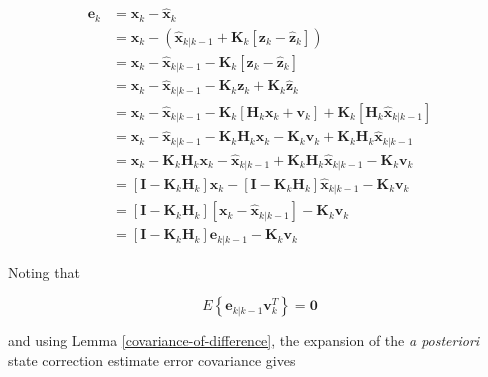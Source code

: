 \documentclass[12pt]{article}
\begin{document}
\begin{equation*}
    \begin{aligned}
        \mathbf{e}_{k} &= \mathbf{x}_{k} - \hat{\mathbf{x}}_{k} \\
        &= \mathbf{x}_{k} - \left( \hat{\mathbf{x}}_{k|k-1} + \mathbf{K}_k \left[ \mathbf{z}_k - \hat{\mathbf{z}}_k \right] \right) \\
        &= \mathbf{x}_{k} - \hat{\mathbf{x}}_{k|k-1} - \mathbf{K}_k \left[ \mathbf{z}_k - \hat{\mathbf{z}}_k \right] \\
        &= \mathbf{x}_{k} - \hat{\mathbf{x}}_{k|k-1} - \mathbf{K}_k \mathbf{z}_k + \mathbf{K}_k \hat{\mathbf{z}}_k \\
        &= \mathbf{x}_{k} - \hat{\mathbf{x}}_{k|k-1} - \mathbf{K}_k \left[ \mathbf{H}_k \mathbf{x}_k + \mathbf{v}_k \right]
        + \mathbf{K}_k \left[ \mathbf{H}_k \hat{\mathbf{x}}_{k|k-1} \right] \\
        &= \mathbf{x}_{k} - \hat{\mathbf{x}}_{k|k-1} - \mathbf{K}_k \mathbf{H}_k \mathbf{x}_k - \mathbf{K}_k \mathbf{v}_k + \mathbf{K}_k \mathbf{H}_k \hat{\mathbf{x}}_{k|k-1} \\
        &= \mathbf{x}_{k} - \mathbf{K}_k \mathbf{H}_k \mathbf{x}_k - \hat{\mathbf{x}}_{k|k-1} + \mathbf{K}_k \mathbf{H}_k \hat{\mathbf{x}}_{k|k-1} - \mathbf{K}_k \mathbf{v}_k \\
        &= \left[ \mathbf{I} - \mathbf{K}_k \mathbf{H}_k \right] \mathbf{x}_{k} - \left[ \mathbf{I}
        - \mathbf{K}_k \mathbf{H}_k \right] \hat{\mathbf{x}}_{k|k-1} - \mathbf{K}_k \mathbf{v}_k \\
        &= \left[ \mathbf{I} - \mathbf{K}_k \mathbf{H}_k \right] \left[ \mathbf{x}_{k} - \hat{\mathbf{x}}_{k|k-1} \right] - \mathbf{K}_k \mathbf{v}_k \\
        &= \left[ \mathbf{I} - \mathbf{K}_k \mathbf{H}_k \right] \mathbf{e}_{k|k-1} - \mathbf{K}_k \mathbf{v}_k
    \end{aligned}
\end{equation*}

Noting that

\begin{equation*}
    E \left\{ \mathbf{e}_{k|k-1} \mathbf{v}_k^T \right\} = \mathbf{0}
\end{equation*}

and using Lemma \ref{covariance-of-difference}, the expansion of the \textit{a posteriori}
state correction estimate error covariance gives
\end{document}
